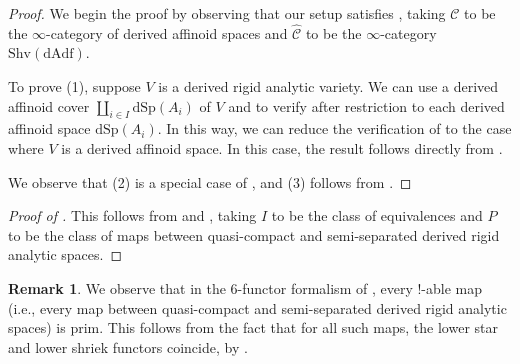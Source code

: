 \documentclass[oneside, hidelinks, 12pt, a4paper,reqno]{amsart}
\theoremstyle{plain}
\theoremstyle{definition}
\newtheorem{remark}[remark]{Remark}
\theoremstyle{plain}
\newcommand{\cC}{\mathscr C}
\newcommand{\dSp}{\mathrm{dSp}}
\newcommand{\cat}{$\infty$-category }
\begin{document}
\begin{proof}
    We begin the proof by observing that our setup satisfies \cite[Assumption 1.3.10]{montagnani2025axiomaticapproachanalytic1affineness}, taking $\cC$ to be the \cat of derived affinoid spaces and $\widehat{\cC}$ to be the \cat $\mathrm{Shv}(\mathrm{dAdf})$.
    
    To prove (1), suppose $V$ is a derived rigid analytic variety. We can use a derived affinoid cover $\coprod_{i \in I} \dSp(A_{i})$ of $V$ and  to verify  after restriction to each derived affinoid space $\dSp(A_{i})$. In this way, we can reduce the verification of  to the case where $V$ is a derived affinoid space. In this case, the result follows directly from \cite[Proposition 1.3.13]{montagnani2025axiomaticapproachanalytic1affineness}.
    
    We observe that (2) is a special case of \cite[Proposition 1.3.14]{montagnani2025axiomaticapproachanalytic1affineness}, and (3) follows from \cite[Proposition 1.3.13 (2)]{montagnani2025axiomaticapproachanalytic1affineness}.
\end{proof}

\begin{proof}[Proof of ]
    This follows from  and \cite[Proposition A.5.10]{mann2022padic6functorformalismrigidanalytic}, taking $I$ to be the class of equivalences and $P$ to be the class of maps between quasi-compact and semi-separated derived rigid analytic spaces. 
\end{proof}

\begin{remark}
    We observe that in the $6$-functor formalism of , every !-able map (i.e., every map between quasi-compact and semi-separated derived rigid analytic spaces) is prim. This follows from the fact that for all such maps, the lower star and lower shriek functors coincide, by \cite[Lemma 4.5.5]{heyer20246functorformalismssmoothrepresentations}.
\end{remark}

\end{document}
